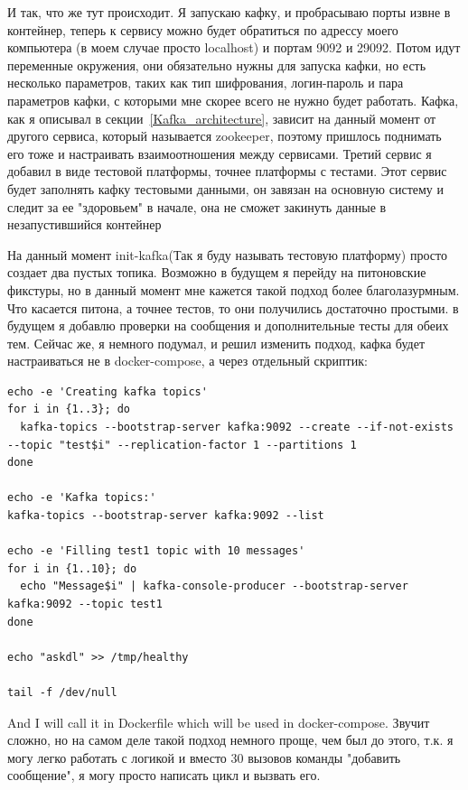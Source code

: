 \documentclass[10pt , a4paper]{report}
\newenvironment{code}{\captionsetup{type=listing}}{}
\begin{document}
И так, что же тут происходит. Я запускаю кафку, и пробрасываю порты извне в контейнер, теперь к сервису можно будет обратиться по адрессу моего компьютера (в моем случае просто localhost) и портам 9092 и 29092. Потом идут переменные окружения, они обязательно нужны для запуска кафки, но есть несколько параметров, таких как тип шифрования, логин-пароль и пара параметров кафки, с которыми мне скорее всего не нужно будет работать. 
Кафка, как я описывал в секции~\ref{Kafka_architecture}, зависит на данный момент от другого сервиса, который называется zookeeper, поэтому пришлось поднимать его тоже и настраивать взаимоотношения между сервисами. Третий сервис я добавил в виде тестовой платформы, точнее платформы с тестами. Этот сервис будет заполнять кафку тестовыми данными, он завязан на основную систему и следит за ее "здоровьем" в начале, она не сможет закинуть данные в незапустившийся контейнер 

На данный момент init-kafka(Так я буду называть тестовую платформу) просто создает два пустых топика. Возможно в будущем я перейду на питоновские фикстуры, но в данный момент мне кажется такой подход более благолазурмным. Что касается питона, а точнее тестов, то они получились достаточно простыми. в будущем я добавлю проверки на сообщения и дополнительные тесты для обеих тем. Сейчас же, я немного подумал, и решил изменить подход, кафка будет настраиваться не в docker-compose, а через отдельный скриптик:

\begin{code}
  \begin{verbatim}
echo -e 'Creating kafka topics'
for i in {1..3}; do
  kafka-topics --bootstrap-server kafka:9092 --create --if-not-exists --topic "test$i" --replication-factor 1 --partitions 1
done

echo -e 'Kafka topics:'
kafka-topics --bootstrap-server kafka:9092 --list

echo -e 'Filling test1 topic with 10 messages'
for i in {1..10}; do
  echo "Message$i" | kafka-console-producer --bootstrap-server kafka:9092 --topic test1
done

echo "askdl" >> /tmp/healthy

tail -f /dev/null

  \end{verbatim}
\end{code}

And I will call it in Dockerfile which will be used in docker-compose. Звучит сложно, но на самом деле такой подход немного проще, чем был до этого, т.к. я могу легко работать с логикой и вместо 30 вызовов команды "добавить сообщение", я могу просто написать цикл и вызвать его.
\end{document}
